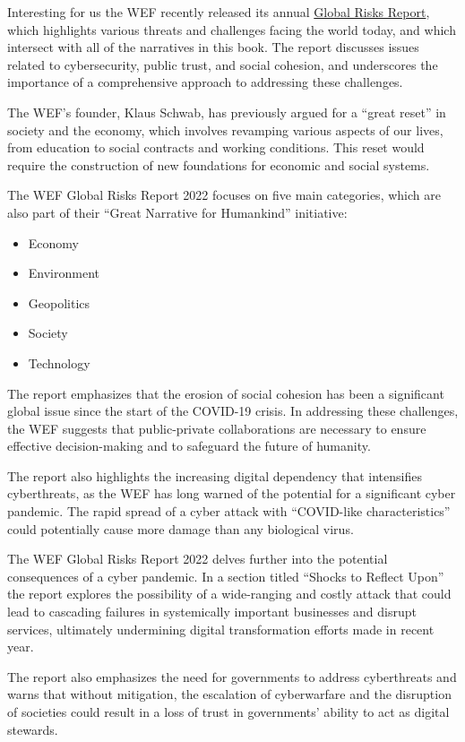 Interesting for us the WEF recently released its annual \href{https://www3.weforum.org/docs/WEF_The_Global_Risks_Report_2022.pdf}{Global Risks Report}, which highlights various threats and challenges facing the world today, and which intersect with all of the narratives in this book. The report discusses issues related to cybersecurity, public trust, and social cohesion, and underscores the importance of a comprehensive approach to addressing these challenges.\par
The WEF's founder, Klaus Schwab, has previously argued for a ``great reset'' in society and the economy, which involves revamping various aspects of our lives, from education to social contracts and working conditions. This reset would require the construction of new foundations for economic and social systems.\par 
The WEF Global Risks Report 2022 focuses on five main categories, which are also part of their ``Great Narrative for Humankind'' initiative:
\begin{itemize}
\item Economy
\item Environment
\item Geopolitics
\item Society
\item Technology
\end{itemize}
The report emphasizes that the erosion of social cohesion has been a significant global issue since the start of the COVID-19 crisis. In addressing these challenges, the WEF suggests that public-private collaborations are necessary to ensure effective decision-making and to safeguard the future of humanity.\par
The report also highlights the increasing digital dependency that intensifies cyberthreats, as the WEF has long warned of the potential for a significant cyber pandemic. The rapid spread of a cyber attack with ``COVID-like characteristics'' could potentially cause more damage than any biological virus.\par
The WEF Global Risks Report 2022 delves further into the potential consequences of a cyber pandemic. In a section titled ``Shocks to Reflect Upon'' the report explores the possibility of a wide-ranging and costly attack that could lead to cascading failures in systemically important businesses and disrupt services, ultimately undermining digital transformation efforts made in recent year.\par
The report also emphasizes the need for governments to address cyberthreats and warns that without mitigation, the escalation of cyberwarfare and the disruption of societies could result in a loss of trust in governments' ability to act as digital stewards.\par
